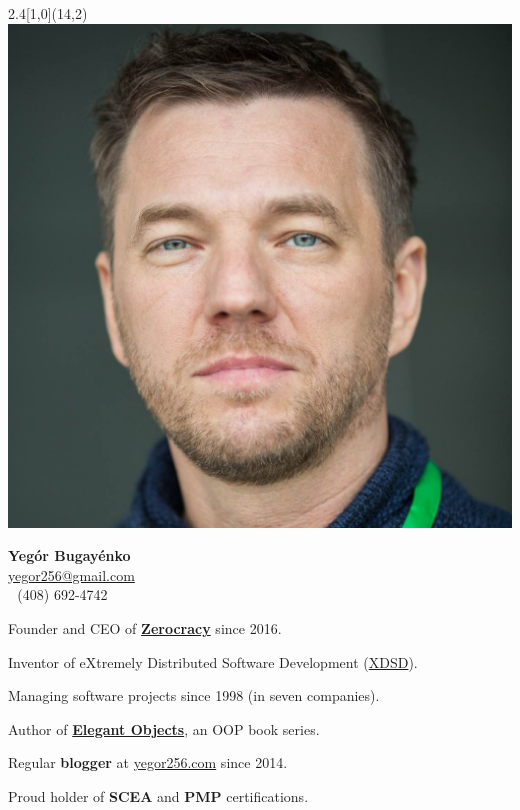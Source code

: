 \documentclass[12pt]{article}
\begin{document}
\setlength{\topskip}{0mm}
\setlength{\parindent}{0pt}
\setlength{\parskip}{8pt}
\raggedright
\large
{}

\begin{textblock}{2.4}[1,0](14,2){
  \includegraphics[width=\textwidth]{../images/face-1200x1200.jpg}
}\end{textblock}

\textbf{\Large Yeg\'or Bugay\'enko}\\%
\href{mailto:yegor256@gmail.com}{yegor256@gmail.com}\\ %
(408) 692-4742

\vspace{2em}

Founder and CEO of \textbf{\href{http://www.zerocracy.com}{Zerocracy}} since 2016.

Inventor of eXtremely Distributed Software Development (\href{http://www.xdsd.org}{XDSD}).

Managing software projects since 1998 (in seven companies).

Author of \textbf{\href{http://www.yegor256.com/elegant-objects.html}{Elegant Objects}},
  an OOP book series.

Regular \textbf{blogger} at \href{http://www.yegor256.com/}{yegor256.com} since 2014.

Proud holder of \textbf{SCEA} and
  \textbf{PMP} certifications.
\end{document}
